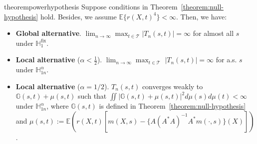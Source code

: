 \documentclass[
  12pt]{article}
\newtheorem{remark}{Remark}
\def\to{\rightarrow}
\newcommand{\ind}{\perp\!\!\!\!\perp}
\def\mE{\mathbb{E}}
\def\mH{\mathbb{H}}
\def\cH{\mathcal{H}}
\def\cT{\mathcal{T}}
\def\mE{\mathbb{E}}
\begin{document}

\begin{restatable}{theorem}{powerhypothesis}
\label{theorem:alternative-hypothesis}
Suppose conditions in Theorem~\ref{theorem:null-hypothesis} hold. Besides, we assume $\mE\{r(X,t)^4\}<\infty$. Then, we have:
\begin{itemize}[noitemsep,topsep=0pt]
    \item[\textbf{\emph{(i)}}] \textbf{Global alternative}.  $\lim_{n \to \infty} \max_{t \in \cT}  |T_n(s,t)| = \infty$ for almost all $s$ under $\mH_1^{\mathrm{fix}}$. 
    \item[\textbf{\emph{(ii)}}] \textbf{Local alternative} ($\alpha < \frac{1}{2}$). $\lim_{n \to \infty} \max_{t \in \cT}$ $|T_n(s,t)| = \infty$ for a.s. $s$ under $\mH^\alpha_{1n}$. 
    \item[\textbf{\emph{(iii)}}] \textbf{Local alternative} ($\alpha = 1/2$). $T_n(s,t)$ converges weakly to $\mathbb{G}(s,t)+\mu(s,t)$ such that $\iint |\mathbb{G}(s,t)+\mu(s,t)|^2 d\mu(s)d\mu(t) < \infty$ under $\mH^\alpha_{1n}$, where $\mathbb{G}(s,t)$ is defined in Theorem~\ref{theorem:null-hypothesis} and $\mu(s,t):=\mathbb{E}(r(X,t)[m(X,s)-\{A(A^*A)^{-1}A^*m(\cdot,s)\}(X)])$.
\end{itemize} 
\end{restatable}
\end{document}
